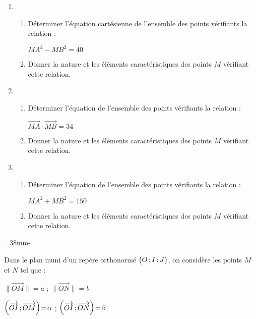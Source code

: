 \documentclass{book}
\begin{document}
\begin{multicols*}{2}
\begin{enumerate}
\item \begin{enumerate}
\item D\'eterminer l'\'equation cart\'esienne de l'ensemble des points v\'erifiants la relation :

\hglue\leftmarginii$MA^2-MB^2=40$

\item Donner la nature et les \'el\'ements caract\'eristiques des points $M$ v\'erifiant cette relation.
\end{enumerate}

\item \begin{enumerate}
\item D\'eterminer l'\'equation de l'ensemble des points v\'erifiants la relation :

\hglue\leftmarginii$\Vec{MA}\cdot\Vec{MB}=34$

\item Donner la nature et les \'el\'ements caract\'eristiques des points $M$ v\'erifiant cette relation.
\end{enumerate}

\item \begin{enumerate}
\item D\'eterminer l'\'equation de l'ensemble des points v\'erifiants la relation :

\hglue\leftmarginii$MA^2+MB^2=150$


\item Donner la nature et les \'el\'ements caract\'eristiques des points $M$ v\'erifiant cette relation.
\end{enumerate}
\end{enumerate}




\leavevmode\exercice


=38mm\hsize\advance{}-
\begin{minipage}[t]{\dimen1}
Dans le plan muni d'un rep\`ere orthonorm\'e $\Se\big(O\,;\,I\,;\,J\big)$, on consid\`ere les points $M$ et $N$ tel que :

\vskip0.2cm
\hglue\leftmarginii$\big\|\Vec{OM}\big\|=a$%
\quad\string;\quad%
$\big\|\Vec{ON}\big\|=b$%


\vskip0.2cm
$\Se \coord{\Vec{OI}}{\Vec{OM}}=\alpha$%
\quad\string;\quad%
$\Se \coord{\Vec{OI}}{\Vec{ON}}=\beta$%

\end{minipage}
\begin{minipage}[t]{\dimen0}
\leavevmode\hfill{}\hbox{}
\end{minipage}


\end{multicols*}
\end{document}
